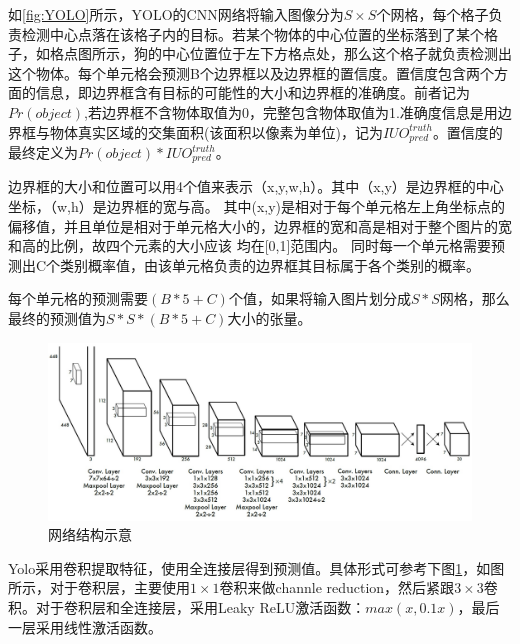 如\ref{fig:YOLO}所示，YOLO的CNN网络将输入图像分为$S\times S$个网格，每个格子负责检测中心点落在该格子内的目标。若某个物体的中心位置的坐标落到了某个格子，如格点图所示，狗的中心位置位于左下方格点处，那么这个格子就负责检测出这个物体。每个单元格会预测B个边界框以及边界框的置信度。置信度包含两个方面的信息，即边界框含有目标的可能性的大小和边界框的准确度。前者记为$Pr(object)$,若边界框不含物体取值为0，完整包含物体取值为1.准确度信息是用边界框与物体真实区域的交集面积(该面积以像素为单位)，记为$IUO^{truth}_{pred}$。置信度的最终定义为$Pr(object)*IUO^{truth}_{pred}$。


边界框的大小和位置可以用4个值来表示（x,y,w,h）。其中（x,y）是边界框的中心坐标，（w,h）是边界框的宽与高。
其中(x,y)是相对于每个单元格左上角坐标点的偏移值，并且单位是相对于单元格大小的，边界框的宽和高是相对于整个图片的宽和高的比例，故四个元素的大小应该 均在[0,1]范围内。
同时每一个单元格需要预测出C个类别概率值，由该单元格负责的边界框其目标属于各个类别的概率。


每个单元格的预测需要$(B*5+C)$个值，如果将输入图片划分成$S*S$网格，那么最终的预测值为$S*S*(B*5+C)$大小的张量。
\begin{figure}[H]
    \centering
    \includegraphics[scale=0.1]{figures/网络结构.jpg}
    \caption{网络结构示意}
    \label{fig:网络}
\end{figure}
Yolo采用卷积提取特征，使用全连接层得到预测值。具体形式可参考下图\ref{fig:网络}，如图所示，对于卷积层，主要使用$1 \times 1$卷积来做channle reduction，然后紧跟$3 \times 3$卷积。对于卷积层和全连接层，采用Leaky ReLU激活函数：$max(x,0.1x)$，最后一层采用线性激活函数。

